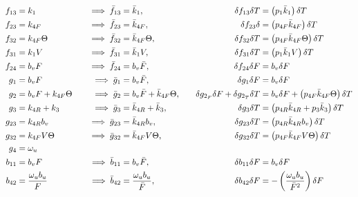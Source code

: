 \begin{align*}
    f_{13} &= k_1 \quad&
    \implies \bar f_{13} &= \bar k_{1}, \quad&
    \delta f_{13} \delta T &= \left(  p_{1} \bar k_{1}  \right) \delta T\\
    f_{23} &= k_{4F} \quad &
    \implies \bar f_{23} &= \bar k_{4F}, \quad &
    \delta f_{23} \delta &= \left(  p_{4F} \bar k_{4F}  \right) \delta T\\
    f_{32} &= k_{4F} \Theta \quad &
    \implies \bar f_{32} &= \bar k_{4F} \Theta, \quad &
    \delta f_{32} \delta T &= \left(  p_{4F}  \bar k_{4F} \Theta  \right) \delta T
    \\
    f_{31} &= k_1 V \quad &
    \implies \bar f_{31} &= \bar k_1 V, \quad &
    \delta f_{31} \delta T &= \left(  p_1 \bar k_1 V  \right) \delta T
    \\
    f_{24} &= b_v F
    \quad &
    \implies \bar f_{24} &= b_v \bar F,
    \quad &
    \delta f_{24} \delta F &= b_v \delta F
    \\
    g_1    &= b_v F
    \quad &
    \implies \bar g_1 &= b_v \bar F,
    \quad &
    \delta g_1 \delta F &= b_v \delta F
    \\
    g_2    &= b_v F + k_{4F} \Theta
    \quad &
    \implies \bar g_2 &= b_v \bar F + \bar k_{4F} \Theta,
    \quad &
    \delta g_{2_F} \delta F + \delta g_{2_T} \delta T &= b_v \delta F +  \left(  p_{4F}  \bar k_{4F}  \Theta  \right) \delta T
    \\
    g_{3}  &= k_{4R}+k_3
    \quad &
    \implies \bar g_3 &= \bar k_{4R} + \bar k_3,
    \quad &
    \delta g_3 \delta T&= \left(  p_{4R} \bar k_{4R} + p_3 \bar k_3 \right) \delta T
    \\
    g_{23} &= k_{4R} b_v
    \quad &
    \implies \bar g_{23} &= \bar k_{4R} b_v,
    \quad &
    \delta g_{23} \delta T &= \left(  p_{4R} \bar k_{4R} b_v  \right) \delta T
    \\
    g_{32} &= k_{4F} V \Theta
    \quad &
    \implies \bar g_{32} &= \bar k_{4F} V \Theta,
    \quad &
    \delta g_{32} \delta T &= \left(  p_{4F} \bar k_{4F} V \Theta  \right) \delta T
    \\
    g_4 &= \omega_u
    \\
    b_{11} &= b_v F
    \quad &
    \implies \bar b_{11} &= b_v \bar F,
    \quad &
    \delta b_{11} \delta F &= b_v \delta F
    \\
    b_{42} &= \frac{\omega_u b_u}{F}
    \quad &
    \implies \bar b_{42} &= \frac{\omega_u b_u}{\bar F},
    \quad &
    \delta b_{42} \delta F &= -\left( \frac{\omega_u b_u}{\bar F^2} \right) \delta F
\end{align*}

